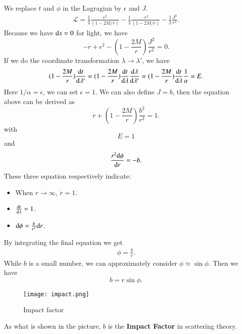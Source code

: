 \documentclass[openany,10pt]{book}
\theoremstyle{definition}
\theoremstyle{definition}
\theoremstyle{remark}
\newcommand{\be}{\begin{eqnarray}}
\newcommand{\ee}{\end{eqnarray}}
\begin{document}
We replace $\dot{t}$ and $\dot{\phi}$ in the Lagragian by $\epsilon$ and $J$.
\be
\mathcal{L}=\frac12\frac{\epsilon^2}{(1-2M/r)}-\frac12\frac{\cdot{r}^2}{(1-2M/r)}-\frac12\frac{J^2}{r^2}.
\ee
Because we have ${\rm{d}}s=0$ for light, we have 
\begin{equation}
    -\dot{r}+\epsilon^2-(1-\frac{2M}{r})\frac{J^2}{r^2}=0.
\end{equation}
If we do the coordinate transformation $\lambda\to\lambda'$, we have 
\begin{equation}
    (1-\frac{2M}{r})\frac{{\rm{d}}t}{{\rm{}d}\lambda'}=(1-\frac{2M}{r})\frac{{\rm{d}}t}{{\rm{d}}\lambda}\frac{{\rm{d}}\lambda}{{\rm{d}}\lambda'}=(1-\frac{2M}{r})\frac{{\rm{d}}t}{{\rm{d}}\lambda}\frac{1}{\alpha}=E.
\end{equation}
Here $1/\alpha=\epsilon$, we can set $\epsilon=1$. We can also define $J=b$, then the equation above can be derived as 
\begin{equation}
\boxed{    \dot{r}+(1-\frac{2M}{r})\frac{b^2}{r^2}=1.}
\end{equation}
with 
\begin{equation}
E=1
\end{equation}
and 
\begin{equation}
    \frac{r^2{\rm{d}}\phi}{{\rm{d}}r}=-b.
\end{equation}
These three equation respectively indicate:
\begin{itemize}
    \item {When $r\to\infty$, $\dot{r}=1$.}\\
    \item{$\frac{{\rm{d}}t}{{\rm{d}}\lambda}=1$.}\\
    \item{${\rm{d}}\phi=\frac{b}{r^2}{\rm{d}}r$.}
\end{itemize}
By integrating the final equation we get 
\be
\phi=\frac br.
\ee
While $b$ is a small number, we can approximately consider $\phi\simeq\sin\phi$. Then we have 
\begin{equation}
    b=r\sin\phi.
\end{equation}

\begin{figure}[htbp]
    \centering
    \texttt{[image: impact.png]}
    \caption{Impact factor}
    \label{impact}
\end{figure}
As what is shown in the picture, $b$ is the \textbf{Impact Factor} in scattering theory. 
\end{document}
